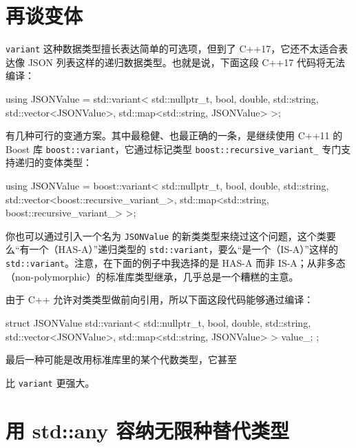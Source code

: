 \section{再谈变体}

\texttt{variant} 这种数据类型擅长表达简单的可选项，但到了 C++17，它还不太适合表达像 JSON 列表这样的递归数据类型。也就是说，下面这段 C++17 代码将无法编译：

\begin{codebox}[cpp]
    using JSONValue = std::variant<
      std::nullptr_t,
      bool,
      double,
      std::string,
      std::vector<JSONValue>,
      std::map<std::string, JSONValue>
    >;
\end{codebox}

有几种可行的变通方案。其中最稳健、也最正确的一条，是继续使用 C++11 的 Boost 库 \texttt{boost::\allowbreak{}variant}，它通过标记类型 \texttt{boost::\allowbreak{}recursive\_\allowbreak{}variant\_\allowbreak{}} 专门支持递归的变体类型：

\begin{codebox}[cpp]
    using JSONValue = boost::variant<
      std::nullptr_t,
      bool,
      double,
      std::string,
      std::vector<boost::recursive_variant_>,
      std::map<std::string, boost::recursive_variant_>
    >;
\end{codebox}

你也可以通过引入一个名为 \texttt{JSON\allowbreak{}Value} 的新类类型来绕过这个问题，这个类要么“有一个（HAS-A）”递归类型的 \texttt{std::\allowbreak{}variant}，要么“是一个（IS-A）”这样的 \texttt{std::\allowbreak{}variant}。注意，在下面的例子中我选择的是 HAS-A 而非 IS-A；从非多态（non-polymorphic）的标准库类型继承，几乎总是一个糟糕的主意。

由于 C++ 允许对类类型做前向引用，所以下面这段代码能够通过编译：

\begin{codebox}[cpp]
    struct JSONValue {
      std::variant<
        std::nullptr_t,
        bool,
        double,
        std::string,
        std::vector<JSONValue>,
        std::map<std::string, JSONValue>
      > value_;
    };
\end{codebox}

最后一种可能是改用标准库里的某个代数类型，它甚至

比 \texttt{variant} 更强大。

\section{用 std::any 容纳无限种替代类型}

